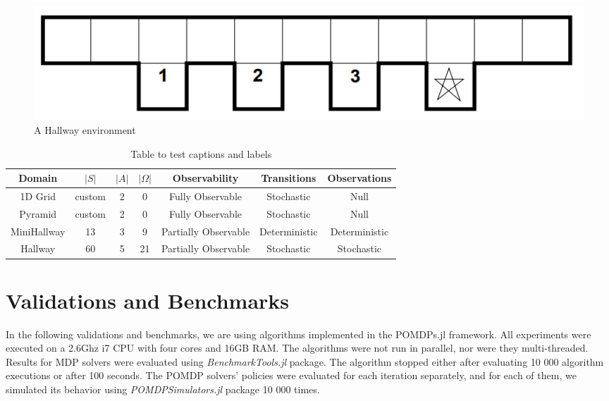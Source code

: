 \begin{figure}[ht]
\caption{A Hallway environment}
\centering
\includegraphics[scale=0.5]{pictures/hallway.png}
\end{figure}








\begin{table}[ht]
\centering
\begin{tabular}{||c c c c c c c||} 
 \hline
 Domain & $|S|$ & $|A|$ & $|\Omega|$ & Observability & Transitions & Observations \\
 \hline\hline
 1D Grid & custom & 2 & 0 & Fully Observable & Stochastic & Null \\
 Pyramid & custom & 2 & 0 & Fully Observable & Stochastic & Null \\
 MiniHallway & 13 & 3 & 9 & Partially Observable & Deterministic & Deterministic \\
 Hallway & 60 & 5 & 21 & Partially Observable & Stochastic & Stochastic \\
 \hline
\end{tabular}
\caption{Table to test captions and labels}
\label{TODO1}
\end{table}



\section{Validations and Benchmarks}

In the following validations and benchmarks, we are using algorithms implemented in the POMDPs.jl framework. All experiments were executed on a 2.6Ghz i7 CPU with four cores and 16GB RAM. The algorithms were not run in parallel, nor were they multi-threaded. Results for MDP solvers were evaluated using \textit{BenchmarkTools.jl} package. The algorithm stopped either after evaluating 10 000 algorithm executions or after 100 seconds. The POMDP solvers' policies were evaluated for each iteration separately, and for each of them, we simulated its behavior using \textit{POMDPSimulators.jl} package 10 000 times.

